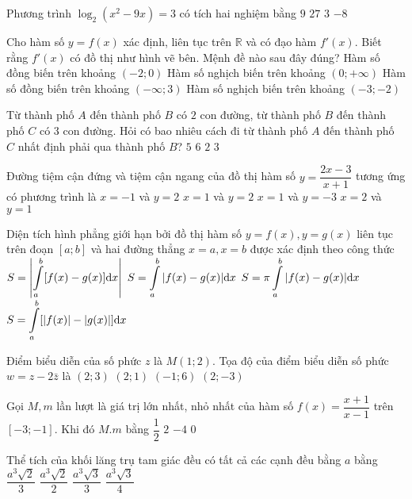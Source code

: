 \begin{ex}%
Phương trình $\log_2\left(x^2-9 x\right)=3$ có tích hai nghiệm bằng
\choice
{$9$}
{$27$}
{$3$}
{\True $-8$}

\end{ex}
\begin{ex}%
Cho hàm số $y=f(x)$ xác định, liên tục trên $\mathbb{R}$ và có đạo hàm $f'(x)$. Biết rằng $f'(x)$ có đồ thị như hình vẽ bên. Mệnh đề nào sau đây đúng?
\choice
{Hàm số đồng biến trên khoảng $(-2; 0)$}
{\True Hàm số nghịch biến trên khoảng $(0;+\infty)$}
{Hàm số đồng biến trên khoảng $(-\infty; 3)$}
{Hàm số nghịch biến trên khoảng $(-3;-2)$}

\end{ex}
\begin{ex}%
Từ thành phố $A$ đến thành phố $B$ có $2$ con đường, từ thành phố ${B}$ đến thành phố $C$ có $3$ con đường. Hỏi có bao nhiêu cách đi từ thành phố $A$ đến thành phố $C$ nhất định phải qua thành phố $B$?
\choice
{$5$}
{\True $6$}
{$2$}
{$3$}

\end{ex}

\begin{ex}%
Đường tiệm cận đứng và tiệm cận ngang của đồ thị hàm số $y=\dfrac{2 x-3}{x+1}$ tương ứng có phương trình là
\choice
{\True $x=-1$ và $y=2$}
{$x=1$ và $y=2$}
{$x=1$ và $y=-3$}
{$x=2$ và $y=1$}

\end{ex}
\begin{ex}%
Diện tích hình phẳng giới hạn bởi đồ thị hàm số $y=f(x), y=g(x)$ liên tục trên đoạn $[a; b]$ và hai đường thẳng $x=a, x=b$ được xác định theo công thức
\choice
{$S=\left|\displaystyle\displaystyle\int\limits_a^{b}[f(x)-g(x)] \mathrm{d} x\right|$}
{\True $S=\displaystyle\displaystyle\int\limits_a^{b}|f(x)-g(x)| \mathrm{d} x$}
{$S=\pi \displaystyle\displaystyle\int\limits_a^{b}|f(x)-g(x)| \mathrm{d} x$}
{$S=\displaystyle\displaystyle\int\limits_a^{b}[|f(x)|-|g(x)|] \mathrm{d} x$}

\end{ex}
\begin{ex}%
Điểm biểu diễn của số phức $z$ là $M(1; 2)$. Tọa độ của điểm biểu diễn số phức $w=z-2\bar{z}$ là
\choice
{$(2; 3)$}
{$(2; 1)$}
{\True $(-1; 6)$}
{$(2;-3)$}

\end{ex}
\begin{ex}%
Gọi $M, m$ lần lượt là giá trị lớn nhất, nhỏ nhất của hàm số $f(x)=  \dfrac{x+1}{x-1}$ trên $[-3;-1]$. Khi đó $M. m$ bằng
\choice
{$\dfrac{1}{2}$}
{$2$}
{$-4$}
{\True $0$}

\end{ex}
\begin{ex}%
Thể tích của khối lăng trụ tam giác đều có tất cả các cạnh đều bằng $a$ bằng
\choice
{$\dfrac{a^3 \sqrt{2}}{3}$}
{$\dfrac{a^3 \sqrt{2}}{2}$}
{$\dfrac{a^3 \sqrt{3}}{3}$}
{\True $\dfrac{a^3 \sqrt{3}}{4}$}

\end{ex}

